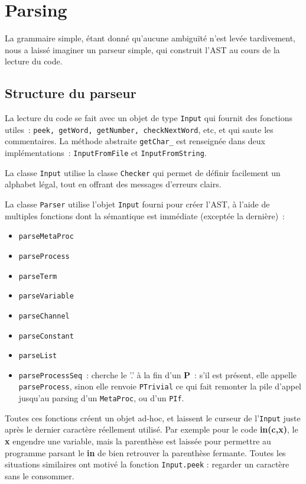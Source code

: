 \documentclass[11pt]{article} %
\begin{document}
\section{Parsing}

La grammaire simple, étant donné qu'aucune ambiguïté n'est levée tardivement, nous a laissé imaginer un parseur simple, qui construit l'AST au cours de la lecture du code.

\subsection{Structure du parseur}

La lecture du code se fait avec un objet de type \texttt{Input} qui fournit des fonctions utiles~: \texttt{peek, getWord, getNumber, checkNextWord}, etc, et qui saute les commentaires.
La méthode abstraite \texttt{getChar\_} est renseignée dans deux implémentations~: \texttt{InputFromFile} et \texttt{InputFromString}.

La classe \texttt{Input} utilise la classe \texttt{Checker} qui permet de définir facilement un alphabet légal, tout en  offrant des messages d'erreurs clairs.

La classe \texttt{Parser} utilise l'objet \texttt{Input} fourni pour créer l'AST, à l'aide de multiples fonctions dont la sémantique est immédiate (exceptée la dernière)~: 
\begin{itemize}
\item \texttt{parseMetaProc} 
\item \texttt{parseProcess}
\item \texttt{parseTerm}
\item \texttt{parseVariable}
\item \texttt{parseChannel}
\item \texttt{parseConstant}
\item \texttt{parseList}
\item \texttt{parseProcessSeq}~: cherche le '.' à la fin d'un \textbf{P}~: s'il est présent, elle appelle \texttt{parseProcess}, sinon elle renvoie \texttt{PTrivial} ce qui fait remonter la pile d'appel jusqu'au parsing d'un \texttt{MetaProc}, ou d'un \texttt{PIf}.
\end{itemize}

Toutes ces fonctions créent un objet ad-hoc, et laissent le curseur de l'\texttt{Input} juste après le dernier caractère réellement utilisé. Par exemple pour le code \textbf{in(c,x)}, le \textbf{x} engendre une variable, mais la parenthèse est laissée pour permettre au programme parsant le \textbf{in} de bien retrouver la parenthèse fermante. Toutes les situations similaires ont motivé la fonction \texttt{Input.peek} : regarder un caractère sans le consommer.
\end{document}
